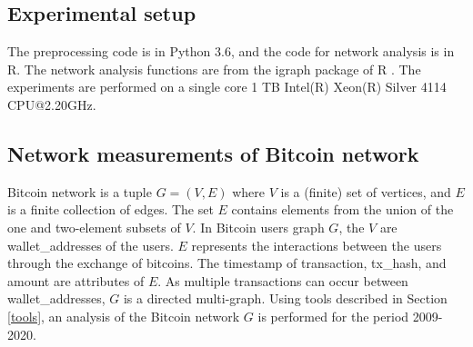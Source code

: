 \documentclass[preprint,12pt]{elsarticle}
\begin{document}
\subsection{Experimental setup}
The preprocessing code is in Python 3.6, and the code for network analysis is in R. The network analysis functions are from the igraph package of R \cite{csardi2006igraph}. The experiments are performed on a single core 1 TB Intel(R) Xeon(R) Silver 4114 CPU@2.20GHz.


\subsection{Network measurements of Bitcoin network} \label{net-prop}

Bitcoin network is a tuple $G = (V, E)$ where $V$ is a (finite) set of vertices, and $E$ is a finite collection of edges. The set $E$ contains elements from the union of the one and two-element subsets of $V$. In Bitcoin users graph $G$, the $V$ are wallet\_addresses of the users. $E$ represents the interactions between the users through the exchange of bitcoins. The timestamp of transaction, tx\_hash, and amount are attributes of $E$. As multiple transactions can occur between wallet\_addresses, $G$ is a directed multi-graph. Using tools described in Section \ref{tools}, an analysis of the Bitcoin network $G$ is performed for the period 2009-2020. 
\end{document}
